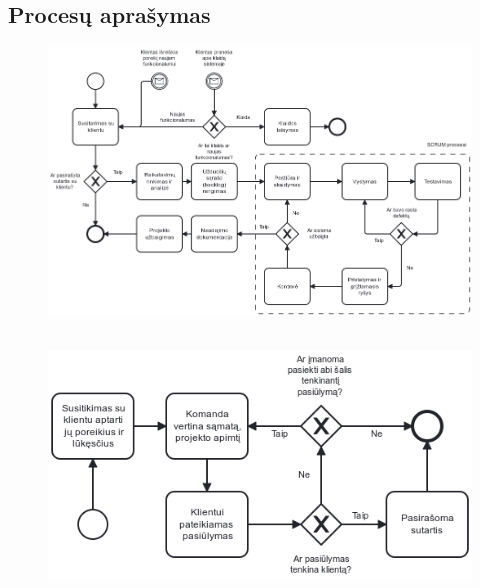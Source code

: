



\begin{landscape}
\section{Procesų aprašymas}
\thispagestyle{empty}
\begin{figure}[H]%
    \centering
    \includegraphics[width=\linewidth]{etc/diagram.png}
\end{figure}
\end{landscape}

\subsection{} %

\begin{figure}[H]%
    \centering
    \includegraphics[width=0.75\linewidth]{etc/engage-client.png}
\end{figure}

